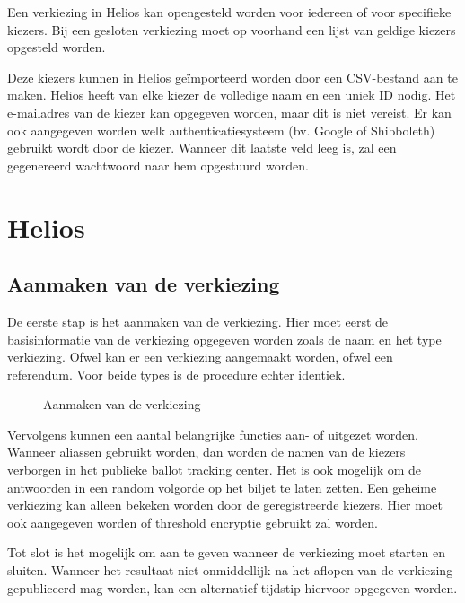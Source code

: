 Een verkiezing in Helios kan opengesteld worden voor iedereen of voor specifieke kiezers. Bij een gesloten verkiezing moet op voorhand een lijst van geldige kiezers opgesteld worden.

\npar Deze kiezers kunnen in Helios ge\"importeerd worden door een CSV-bestand aan te maken. Helios heeft van elke kiezer de volledige naam en een uniek ID nodig. Het e-mailadres van de kiezer kan opgegeven worden, maar dit is niet vereist. Er kan ook aangegeven worden welk authenticatiesysteem (bv. Google of Shibboleth) gebruikt wordt door de kiezer. Wanneer dit laatste veld leeg is, zal een gegenereerd wachtwoord naar hem opgestuurd worden.

\section{Helios}
\label{sec:proc:helios}

\subsection{Aanmaken van de verkiezing}

De eerste stap is het aanmaken van de verkiezing. Hier moet eerst de basisinformatie van de verkiezing opgegeven worden zoals de naam en het type verkiezing. Ofwel kan er een verkiezing aangemaakt worden, ofwel een referendum. Voor beide types is de procedure echter identiek.

\begin{figure}
  \caption{Aanmaken van de verkiezing}
  \label{fig:proc:elections_new}
\end{figure}


\npar Vervolgens kunnen een aantal belangrijke functies aan- of uitgezet worden. Wanneer aliassen gebruikt worden, dan worden de namen van de kiezers verborgen in het publieke ballot tracking center. Het is ook mogelijk om de antwoorden in een random volgorde op het biljet te laten zetten. Een geheime verkiezing kan alleen bekeken worden door de geregistreerde kiezers. Hier moet ook aangegeven worden of threshold encryptie gebruikt zal worden.

\npar Tot slot is het mogelijk om aan te geven wanneer de verkiezing moet starten en sluiten. Wanneer het resultaat niet onmiddellijk na het aflopen van de verkiezing gepubliceerd mag worden, kan een alternatief tijdstip hiervoor opgegeven worden.

